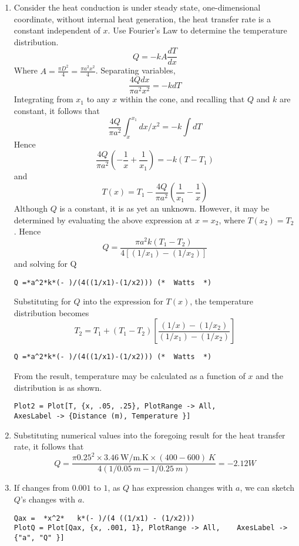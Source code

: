 \begin{solution}
\begin{enumerate}
\item
Consider the heat conduction is under steady state, one-dimensional coordinate,
without internal heat generation, the heat transfer rate is a constant independent
of $x$. Use Fourier’s Law to determine the temperature distribution.
$$Q=-kA\frac{dT}{dx}$$
Where $A=\frac{\pi D^2}{4}=\frac{\pi a^2x^2}{4}$. Separating variables,
$$\frac{4Qdx}{\pi a^2x^2}=-kdT$$
Integrating from $x_1$ to any $x$ within the cone, and recalling that $Q$ and $k$
are constant, it follows that
$$\frac{4Q}{\pi a^2}\int_x^{x_1} dx/x^2=-k\int dT$$
Hence
$$\frac{4Q}{\pi a^2}\left(-\frac{1}{x}+\frac{1}{x_1}\right)=-k\left(T-T_1\right)$$
and
$$T(x)=T_1-\frac{4Q}{\pi a^2}\left(\frac{1}{x_1}-\frac{1}{x}\right)$$
Although $Q$ is a constant, it is as yet an unknown.
However, it may be determined by evaluating the above expression at
$x=x_2$, where $T(x_2)=T_2$. Hence
$$Q=\frac{\pi a^2k(T_1-T_2)}{4[(1/x_1)-(1/x_2)]}$$
and solving for Q
\begin{lstlisting}
Q =*a^2*k*(- )/(4((1/x1)-(1/x2))) (*  Watts  *)
\end{lstlisting}
Substituting for $Q$ into the expression for $T(x)$,
the temperature distribution becomes
$$T_2=T_1+(T_1-T_2)\left[\frac{(1/x)-(1/x_2)}{(1/x_1)-(1/x_2)}\right]$$
\begin{lstlisting}
Q =*a^2*k*(- )/(4((1/x1)-(1/x2))) (*  Watts  *)
\end{lstlisting}
From the result, temperature may be calculated as a function of $x$
and the distribution is as shown.
\begin{lstlisting}
Plot2 = Plot[T, {x, .05, .25}, PlotRange -> All, 
AxesLabel -> {Distance (m), Temperature }]
\end{lstlisting}
\item
Substituting numerical values into the foregoing result for the heat 
transfer rate, it follows that
$$Q=\frac{\pi 0.25^2\times3.46~\text{W/m.K}\times(400-600)~K}{4(1/0.05~m - 1/0.25~m)}=-2.12W$$
\item
If changes from $0.001$ to $1$, as $Q$ has expression changes with $a$,
we can sketch $Q$’s changes with $a$.
\begin{lstlisting}
Qax =  *x^2*   k*(- )/(4 ((1/x1) - (1/x2)))
PlotQ = Plot[Qax, {x, .001, 1}, PlotRange -> All,    AxesLabel -> {"a", "Q" }]
\end{lstlisting}
\end{enumerate}
\end{solution}

